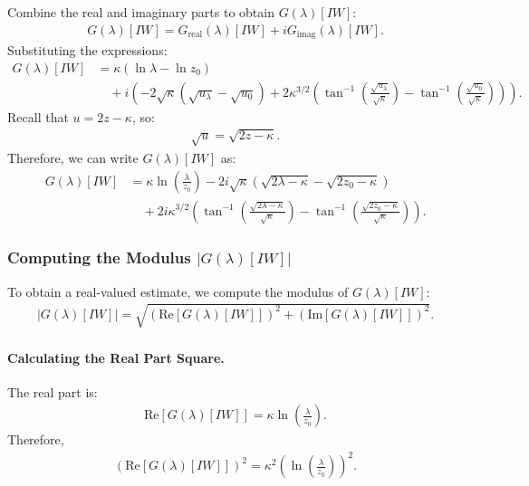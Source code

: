 Combine the real and imaginary parts to obtain $G(\lambda)[IW]$:
\begin{align}
G(\lambda)[IW] = G_{\text{real}}(\lambda)[IW] + i G_{\text{imag}}(\lambda)[IW].
\end{align}
%
Substituting the expressions:
\begin{align}
\nonumber
G(\lambda)[IW] 
   &= \kappa \left( \ln \lambda - \ln z_0 \right )   \\
   &\quad + i \left( - 2 \sqrt{ \kappa } \left( \sqrt{ u_\lambda } - \sqrt{ u_0 } \right ) + 2 \kappa^{ 3/2 } \left( \tan^{-1} \left( \frac{ \sqrt{ u_\lambda } }{ \sqrt{ \kappa } } \right ) - \tan^{-1} \left( \frac{ \sqrt{ u_0 } }{ \sqrt{ \kappa } } \right ) \right ) \right ).
\end{align}
%
Recall that $u = 2z - \kappa$, so:
\begin{align}
\sqrt{ u } = \sqrt{ 2z - \kappa }.
\end{align}
%
Therefore, we can write $G(\lambda)[IW]$ as:
\begin{align}
\nonumber
G(\lambda)[IW] 
   &= \kappa \ln \left( \frac{ \lambda }{ z_0 } \right ) - 2 i \sqrt{ \kappa } \left( \sqrt{ 2 \lambda - \kappa } - \sqrt{ 2 z_0 - \kappa } \right ) \\
   &\quad + 2 i \kappa^{ 3/2 } \left( \tan^{-1} \left( \frac{ \sqrt{ 2 \lambda - \kappa } }{ \sqrt{ \kappa } } \right ) - \tan^{-1} \left( \frac{ \sqrt{ 2 z_0 - \kappa } }{ \sqrt{ \kappa } } \right ) \right ).
\end{align}


\subsubsection{Computing the Modulus $|G(\lambda)[IW]|$}

To obtain a real-valued estimate, we compute the modulus of $G(\lambda)[IW]$:
\begin{align}
| G(\lambda)[IW] | = \sqrt{ \left( \text{Re}[ G(\lambda)[IW] ] \right )^2 + \left( \text{Im}[ G(\lambda)[IW] ] \right )^2 }.
\end{align}


\paragraph{Calculating the Real Part Square.}

The real part is:
\begin{align}
\text{Re}[ G(\lambda)[IW] ] = \kappa \ln \left( \frac{ \lambda }{ z_0 } \right ).
\end{align}
%
Therefore,
\begin{align}
\left( \text{Re}[ G(\lambda)[IW] ] \right )^2 = \kappa^2 \left( \ln \left( \frac{ \lambda }{ z_0 } \right ) \right )^2.
\end{align}


